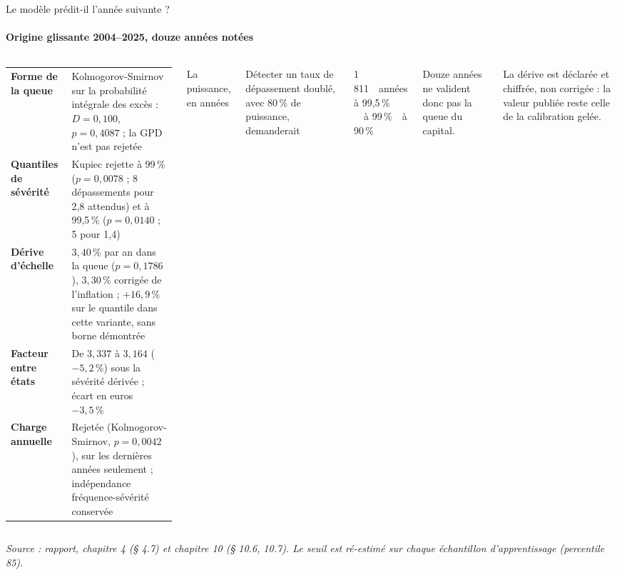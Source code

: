 \documentclass[aspectratio=169,10pt,t]{beamer}
\newcommand{\source}[1]{\par\vfill{\tiny\color{gris}\textit{Source : #1}}\par\vspace{-1mm}}
\renewcommand{\arraystretch}{1.25}
\begin{document}
\begin{frame}{Le modèle prédit-il l'année suivante ?}
  \framesubtitle{\etabli Origine glissante 2004--2025, douze années notées}
  \begin{columns}[T,onlytextwidth]
    \footnotesize
    \renewcommand{\arraystretch}{1.18}
    \begin{tabularx}{\linewidth}{@{}>{\bfseries}l Y@{}}
      \toprule
      Forme de la queue & Kolmogorov-Smirnov sur la probabilité intégrale des excès : $D=0{,}100$, $p=0{,}4087$ ; la GPD n'est pas rejetée \\
      Quantiles de sévérité & Kupiec rejette à 99\,\% ($p=0{,}0078$ ; 8 dépassements pour 2,8 attendus) et à 99,5\,\% ($p=0{,}0140$ ; 5 pour 1,4) \\
      Dérive d'échelle & $3{,}40\,\%$ par an dans la queue ($p=0{,}1786$), $3{,}30\,\%$ corrigée de l'inflation ; $+16{,}9\,\%$ sur le quantile dans cette variante, sans borne démontrée \\
      Facteur entre états & De $3{,}337$ à $3{,}164$ ($-5{,}2\,\%$) sous la sévérité dérivée ; écart en euros $-3{,}5\,\%$ \\
      Charge annuelle & Rejetée (Kolmogorov-Smirnov, $p=0{,}0042$), sur les dernières années seulement ; indépendance fréquence-sévérité conservée \\
      \bottomrule
    \end{tabularx}
    \footnotesize
    {\editorial\normalsize La puissance, en années}\par\vspace{1.5mm}
    Détecter un taux de dépassement doublé, avec 80\,\% de puissance, demanderait
    \begin{center}
      {\editorial\fontsize{17}{19}\selectfont\color{accent}1\,811}\ \ années à 99,5\,\%\\[1mm]
      {\editorial\fontsize{13}{15}}\ \ à 99\,\%\ \ à 90\,\%
    \end{center}
    Douze années ne valident donc pas la queue du capital.\par\vspace{2mm}
    {\color{accent}La dérive est déclarée et chiffrée, non corrigée :} la valeur publiée reste celle de la calibration gelée.
  \end{columns}
  \source{rapport, chapitre 4 (§ 4.7) et chapitre 10 (§ 10.6, 10.7). Le seuil est ré-estimé sur chaque échantillon d'apprentissage (percentile 85).}
\end{frame}
\end{document}
